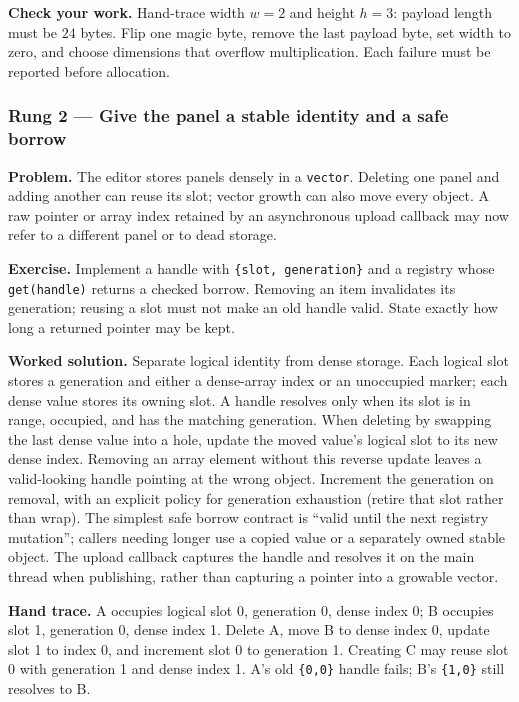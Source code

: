 \textbf{Check your work.} Hand-trace width \(w=2\) and height \(h=3\): payload length must be \(24\) bytes. Flip one magic byte, remove the last payload byte, set width to zero, and choose dimensions that overflow multiplication. Each failure must be reported before allocation.

\subsubsection{Rung 2 --- Give the panel a stable identity and a safe borrow}\label{rung-2-give-the-panel-a-stable-identity-and-a-safe-borrow}

\textbf{Problem.} The editor stores panels densely in a \texttt{vector}. Deleting one panel and adding another can reuse its slot; vector growth can also move every object. A raw pointer or array index retained by an asynchronous upload callback may now refer to a different panel or to dead storage.

\textbf{Exercise.} Implement a handle with \texttt{\{slot,\ generation\}} and a registry whose \texttt{get(handle)} returns a checked borrow. Removing an item invalidates its generation; reusing a slot must not make an old handle valid. State exactly how long a returned pointer may be kept.

\textbf{Worked solution.} Separate logical identity from dense storage. Each logical slot stores a generation and either a dense-array index or an unoccupied marker; each dense value stores its owning slot. A handle resolves only when its slot is in range, occupied, and has the matching generation. When deleting by swapping the last dense value into a hole, update the moved value's logical slot to its new dense index. Removing an array element without this reverse update leaves a valid-looking handle pointing at the wrong object. Increment the generation on removal, with an explicit policy for generation exhaustion (retire that slot rather than wrap). The simplest safe borrow contract is ``valid until the next registry mutation''; callers needing longer use a copied value or a separately owned stable object. The upload callback captures the handle and resolves it on the main thread when publishing, rather than capturing a pointer into a growable vector.

\textbf{Hand trace.} A occupies logical slot 0, generation 0, dense index 0; B occupies slot 1, generation 0, dense index 1. Delete A, move B to dense index 0, update slot 1 to index 0, and increment slot 0 to generation 1. Creating C may reuse slot 0 with generation 1 and dense index 1. A's old \texttt{\{0,0\}} handle fails; B's \texttt{\{1,0\}} still resolves to B.

